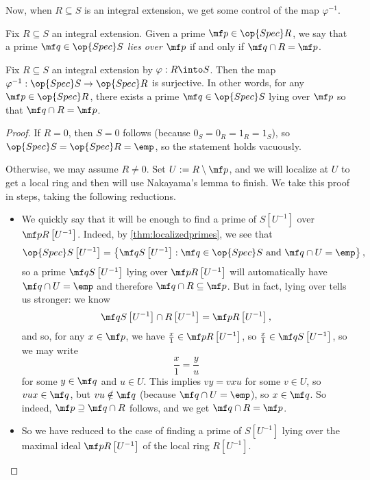 Now, when $R\subseteq S$ is an integral extension, we get some control of the map $\varphi^{-1}$.
\begin{definition}
	Fix $R\subseteq S$ an integral extension. Given a prime $\mf p\in\op{Spec}R$, we say that a prime $\mf q\in\op{Spec}S$ \textit{lies over $\mf p$} if and only if $\mf q\cap R=\mf p$.
\end{definition}
\begin{proposition} \label{prop:liftprimes}
	Fix $R\subseteq S$ an integral extension by $\varphi:R\into S$. Then the map $\varphi^{-1}:\op{Spec}S\to\op{Spec}R$ is surjective. In other words, for any $\mf p\in\op{Spec}R$, there exists a prime $\mf q\in\op{Spec}S$ lying over $\mf p$ so that $\mf q\cap R=\mf p$.
\end{proposition}
\begin{proof}
	If $R=0$, then $S=0$ follows (because $0_S=0_R=1_R=1_S$), so $\op{Spec}S=\op{Spec}R=\emp$, so the statement holds vacuously.
	
	Otherwise, we may assume $R\ne0$. Set $U:=R\setminus\mf p$, and we will localize at $U$ to get a local ring and then will use Nakayama's lemma to finish. We take this proof in steps, taking the following reductions.
	\begin{itemize}
		\item We quickly say that it will be enough to find a prime of $S\left[U^{-1}\right]$ over $\mf pR\left[U^{-1}\right]$. Indeed, by \autoref{thm:localizedprimes}, we see that
		\[\op{Spec}S\left[U^{-1}\right]=\left\{\mf qS\left[U^{-1}\right]:\mf q\in\op{Spec}S\text{ and }\mf q\cap U=\emp\right\},\]
		so a prime $\mf qS\left[U^{-1}\right]$ lying over $\mf pR\left[U^{-1}\right]$ will automatically have $\mf q\cap U=\emp$ and therefore $\mf q\cap R\subseteq\mf p$. But in fact, lying over tells us stronger: we know
		\[\mf qS\left[U^{-1}\right]\cap R\left[U^{-1}\right]=\mf pR\left[U^{-1}\right],\]
		and so, for any $x\in\mf p$, we have $\frac x1\in\mf pR\left[U^{-1}\right]$, so $\frac{x}1\in\mf qS\left[U^{-1}\right]$, so we may write
		\[\frac{x}1=\frac y{u}\]
		for some $y\in\mf q$ and $u\in U$. This implies $vy=vxu$ for some $v\in U$, so $vux\in\mf q$, but $vu\notin\mf q$ (because $\mf q\cap U=\emp$), so $x\in\mf q$. So indeed, $\mf p\supseteq\mf q\cap R$ follows, and we get $\mf q\cap R=\mf p$.
	
		\item So we have reduced to the case of finding a prime of $S\left[U^{-1}\right]$ lying over the maximal ideal $\mf pR\left[U^{-1}\right]$ of the local ring $R\left[U^{-1}\right]$.
		

\end{itemize}
\end{proof}
